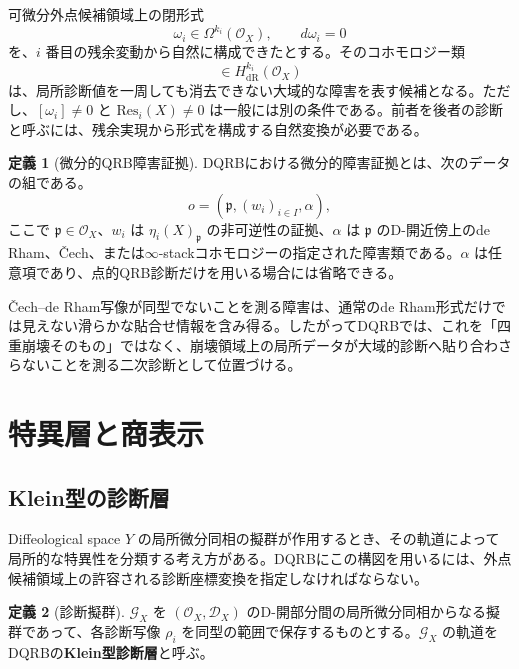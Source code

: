 \documentclass[a4paper,11pt]{ltjsarticle}
\theoremstyle{definition}
\newtheorem{definition}{定義}[section]
\theoremstyle{plain}
\newcommand{\Res}{\mathrm{Res}}
\newcommand{\HdR}{H_{\mathrm{dR}}}
\begin{document}
可微分外点候補領域上の閉形式
\begin{equation}
 \omega_i\in\Omega^{k_i}(\mathcal O_X),
 \qquad d\omega_i=0
 \end{equation}
を、$i$ 番目の残余変動から自然に構成できたとする。そのコホモロジー類
\begin{equation}
 [\omega_i]\in\HdR^{k_i}(\mathcal O_X)
 \end{equation}
は、局所診断値を一周しても消去できない大域的な障害を表す候補となる。ただし、$[\omega_i]\neq0$ と $\Res_i(X)\neq0$ は一般には別の条件である。前者を後者の診断と呼ぶには、残余実現から形式を構成する自然変換が必要である。

\begin{definition}[微分的QRB障害証拠]
DQRBにおける微分的障害証拠とは、次のデータの組である。
\begin{equation}
 o=(\mathfrak p,(w_i)_{i\in I},\alpha),
 \label{eq:differential-witness}
\end{equation}
ここで $\mathfrak p\in\mathcal O_X$、$w_i$ は $\eta_i(X)_{\mathfrak p}$ の非可逆性の証拠、$\alpha$ は $\mathfrak p$ のD-開近傍上のde Rham、\v{C}ech、または$\infty$-stackコホモロジーの指定された障害類である。$\alpha$ は任意項であり、点的QRB診断だけを用いる場合には省略できる。
\end{definition}

\v{C}ech--de Rham写像が同型でないことを測る障害は、通常のde Rham形式だけでは見えない滑らかな貼合せ情報を含み得る\cite{Minichiello2024Obstruction}。したがってDQRBでは、これを「四重崩壊そのもの」ではなく、崩壊領域上の局所データが大域的診断へ貼り合わさらないことを測る二次診断として位置づける。

\section{特異層と商表示}

\subsection{Klein型の診断層}

Diffeological space $Y$ の局所微分同相の擬群が作用するとき、その軌道によって局所的な特異性を分類する考え方がある\cite{IglesiasZemmour2025Why}。DQRBにこの構図を用いるには、外点候補領域上の許容される診断座標変換を指定しなければならない。

\begin{definition}[診断擬群]
$\mathcal G_X$ を $(\mathcal O_X,\mathcal D_X)$ のD-開部分間の局所微分同相からなる擬群であって、各診断写像 $\rho_i$ を同型の範囲で保存するものとする。$\mathcal G_X$ の軌道をDQRBの\textbf{Klein型診断層}と呼ぶ。
\end{definition}
\end{document}
